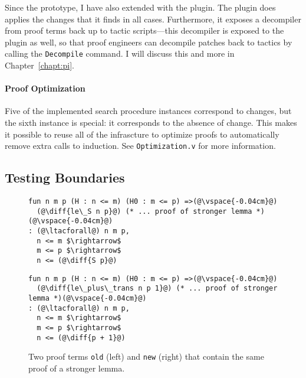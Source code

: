 Since the \sysname prototype, I have also extended \sysnamelong with the \toolnamec plugin.
The \toolnamec plugin does applies the changes that it finds in all cases.
Furthermore, it exposes a decompiler from proof terms back up to tactic scripts---this
decompiler is exposed to the \sysname plugin as well, so that proof engineers can decompile patches
back to tactics by calling the \lstinline{Decompile} command.
I will discuss this and more in Chapter~\ref{chapt:pi}.

\paragraph{Proof Optimization}
Five of the implemented search procedure instances correspond to changes, but the sixth instance is special:
it corresponds to the absence of change.
This makes it possible to reuse all of the \sysname infrascture to optimize proofs
to automatically remove extra calls to induction.
See \lstinline{Optimization.v} for more information.

\subsection{Testing Boundaries}
\label{sec:eval}

\begin{figure*}[ht]
\begin{minipage}{0.48\textwidth}
\begin{lstlisting}[language=coq]
fun n m p (H : n <= m) (H0 : m <= p) =>(@\vspace{-0.04cm}@)
  (@\diff{le\_S n p}@) (* ... proof of stronger lemma *)(@\vspace{-0.04cm}@)
: (@\ltacforall@) n m p,
  n <= m $\rightarrow$
  m <= p $\rightarrow$
  n <= (@\diff{S p}@)
\end{lstlisting}
\end{minipage}
\hfill
\begin{minipage}{0.48\textwidth}
\begin{lstlisting}[language=coq]
fun n m p (H : n <= m) (H0 : m <= p) =>(@\vspace{-0.04cm}@)
  (@\diff{le\_plus\_trans n p 1}@) (* ... proof of stronger lemma *)(@\vspace{-0.04cm}@)
: (@\ltacforall@) n m p,
  n <= m $\rightarrow$
  m <= p $\rightarrow$
  n <= (@\diff{p + 1}@)
\end{lstlisting}
\end{minipage}
\caption{Two proof terms \lstinline{old} (left) and \lstinline{new} (right) that contain the same proof of a stronger lemma.}
\label{fig:stronger}
\end{figure*}

